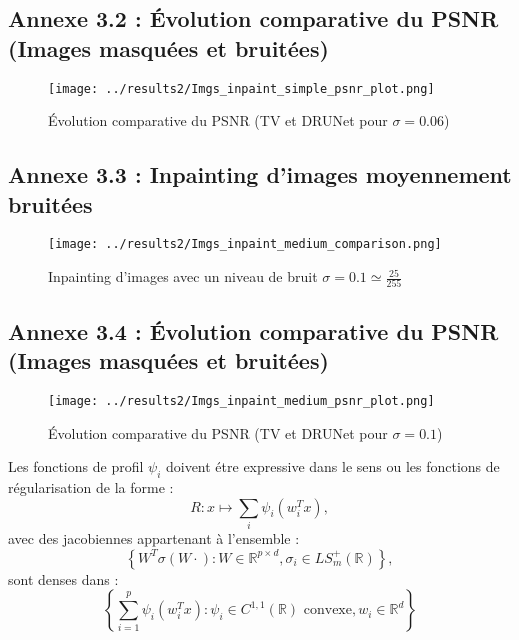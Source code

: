 \documentclass[a4paper, 12pt]{report} %
\begin{document}
\subsection*{Annexe 3.2 : Évolution comparative du PSNR (Images masquées et bruitées)}

\begin{figure}[H]
\centering
\begin{adjustbox}{width=1\linewidth, totalheight=0.5 \textheight, angle=0, scale= 0.72, minipage= 4.2\linewidth, margin= 0}
\texttt{[image: ../results2/Imgs\_inpaint\_simple\_psnr\_plot.png]}
\end{adjustbox}
\caption{Évolution comparative du PSNR (TV et DRUNet pour $\sigma = 0.06$)} 
    \label{fig:29}
\end{figure}

\subsection*{Annexe 3.3 : Inpainting d'images moyennement bruitées}

\begin{figure}[H]
\centering
\begin{adjustbox}{width=1\linewidth, totalheight=0.5 \textheight, angle=0, scale= 0.72, minipage= 4.2\linewidth, margin= 0}
    \texttt{[image: ../results2/Imgs\_inpaint\_medium\_comparison.png]}
\end{adjustbox}
    \caption{Inpainting d'images avec un niveau de bruit $\sigma = 0.1 \simeq \frac{25}{255}$}
    \label{fig:30}
\end{figure} 

\subsection*{Annexe 3.4 : Évolution comparative du PSNR (Images masquées et bruitées)}

\begin{figure}[H]
\centering
\begin{adjustbox}{width=1\linewidth, totalheight=0.5 \textheight, angle=0, scale= 0.72, minipage= 4.2\linewidth, margin= 0}
\texttt{[image: ../results2/Imgs\_inpaint\_medium\_psnr\_plot.png]}
\end{adjustbox}
\caption{Évolution comparative du PSNR (TV et DRUNet pour $\sigma = 0.1$)} 
    \label{fig:31}
\end{figure}
Les fonctions de profil \( \psi_i \) doivent étre expressive dans le sens ou les fonctions de régularisation de la forme :
\[ R: x \mapsto \sum_{i} \psi_i(w_i^T x),\]
avec des jacobiennes appartenant à l'ensemble :
\[
\left\{ W^T \sigma(W \cdot) : W \in \mathbb{R}^{p \times d}, \sigma_i \in LS_m^+(\mathbb{R}) \right\},
\]
sont denses dans :
\[
\left\{\sum_{i=1}^p \psi_i(w_i^T x) : \psi_i \in C^{1,1}(\mathbb{R}) \text{ convexe}, w_i \in \mathbb{R}^d \right\}
\]





 
\end{document}
